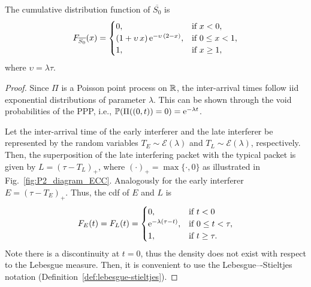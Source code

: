 \begin{theorem} \label{th:F_S0}
    The cumulative distribution function of $\overline{S_0}$ is
    \begin{align*}
        F_{\overline{S_0}}(x) = 
        \begin{cases}
            0, & \text{if } x < 0, \\
            (1 + \upsilon\,x)\,\mathrm{e}^{-\upsilon\,(2-x)}, & \text{if } 0 \le x < 1,\\
            1, & \text{if } x \ge 1,
        \end{cases}
    \end{align*}
    where $\upsilon = \lambda\tau$.
\end{theorem}
%
\begin{proof}
    Since $\Pi$ is a Poisson point process on ${\mathbb R}$, the inter-arrival times follow iid exponential distributions of parameter $\lambda$. This can be shown through the void probabilities of the PPP, i.e., ${\mathbb P}(\Pi((0,t))=0) = \mathrm{e}^{-\lambda t}$.
    
    Let the inter-arrival time of the early interferer and the late interferer be represented by the random variables $T_E\sim\mathscr{E}(\lambda)$ and $T_L\sim\mathscr{E}(\lambda)$, respectively.
    Then, the superposition of the late interfering packet with the typical packet is given by $L = (\tau - T_L)_+$, where $(\cdot)_+ = \max\{\cdot,0\}$ as illustrated in Fig.~\ref{fig:P2_diagram_ECC}. Analogously for the early interferer $E = (\tau - T_E)_+$.
    Thus, the cdf of $E$ and $L$ is
    \[
        F_E(t) = F_L(t) = %
        \begin{cases}
            0, &\text{if } t < 0 \\
            \euler^{-\lambda(\tau-t)}, &\text{if } 0 \le t < \tau,\\
            1, &\text{if } t \ge \tau.
        \end{cases}
    \]
    Note there is a discontinuity at $t=0$, thus the density does not exist with respect to the Lebesgue measure. Then, it is convenient to use the Lebesgue–-Stieltjes notation (Definition~\ref{def:lebesgue-stieltjes}).
    

\end{proof}
